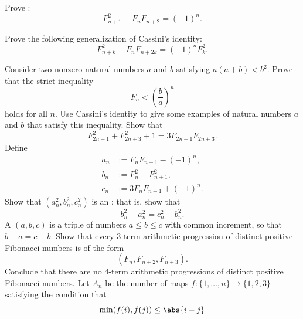 \begin{challenge}
  \exercise
  \begin{subexenum}
  \item Prove :
    \begin{equation*}
      F_{n+1}^2-F_nF_{n+2}=(-1)^n.
    \end{equation*}
  \item Prove the following generalization of Cassini's identity:
    \begin{equation*}
      F_{n+k}^2 - F_{n}F_{n+2k} = (-1)^n F_k^2.
    \end{equation*}
  \end{subexenum}
  \exercise Consider two nonzero natural numbers $a$ and $b$ satisfying $a(a+b) < b^2$. Prove that the strict inequality
  \begin{equation*}
    F_n<\left(\frac{b}{a}\right)^n
  \end{equation*}
  holds for all $n$. Use Cassini's identity to give some examples of natural numbers $a$ and $b$ that satisfy this inequality.
  \exercise Show that
  \begin{equation*}
    F_{2n+1}^2+F_{2n+3}^2+1 = 3F_{2n+1}F_{2n+3}.
  \end{equation*}
  \exercise \label{exercise:arithmetic-progression-fibonacci}Define
  \begin{align*}
    a_n & := F_{n}F_{n+1}- (-1)^n, \\
    b_n & := F_{n}^2 + F_{n+1}^2, \\
    c_n & := 3F_{n}F_{n+1}+(-1)^{n}.
  \end{align*}
  Show that $(a_n^2,b_n^2,c_n^2)$ is an ; that is, show that
  \begin{equation*}
    b_n^2-a_n^2=c_n^2-b_n^2.
  \end{equation*}
  \exercise A  $(a,b,c)$ is a triple of numbers $a\leq b\leq c$ with common increment, so that $b-a=c-b$. Show that every 3-term arithmetic progression of distinct positive Fibonacci numbers is of the form
  \begin{equation*}
    (F_n,F_{n+2},F_{n+3}).
  \end{equation*}
  Conclude that there are no 4-term arithmetic progressions of distinct positive Fibonacci numbers.
  \exercise Let $A_n$ be the number of maps $f:\{1,\ldots, n\}\to\{1,2,3\}$ satisfying the condition that
  \begin{equation*}
    \min(f(i),f(j))\leq \abs{i-j}

\end{equation*}
\end{challenge}
